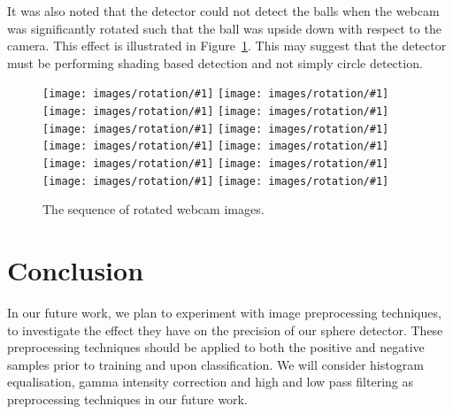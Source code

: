 \documentclass{llncs}
\begin{document}
{		It was also noted that the detector could not detect the balls when the webcam was significantly rotated such that the ball was upside down with respect to the camera. This effect is illustrated in Figure~\ref{fig:rotated_sequence}. This may suggest that the detector must be performing shading based detection and not simply circle detection.



		\newcommand{\includesequence}[1]{\hspace{0.05cm}\texttt{[image: images/rotation/\#1]}}

		\begin{figure}
			\centering
			\includesequence{2}
			\includesequence{25}
			\includesequence{31}
			\includesequence{35} \\
			\vspace{0.1cm}
			\includesequence{39}
			\includesequence{43}
			\includesequence{49}
			\includesequence{53} \\
			\vspace{0.1cm}
			\includesequence{59}
			\includesequence{64}
			\includesequence{69}
			\includesequence{74} \\
			\caption{The sequence of rotated webcam images.}
			\label{fig:rotated_sequence}
		\end{figure}


	}

	\section{Conclusion} {
	\label{sec:conclusion}


		In our future work, we plan to experiment with image preprocessing techniques, to investigate the effect they have on the precision of our sphere detector. These preprocessing techniques should be applied to both the positive and negative samples prior to training and upon classification. We will consider histogram equalisation, gamma intensity correction and high and low pass filtering \citep{gross2003image} as preprocessing techniques in our future work.

	}

	
	
\end{document}
